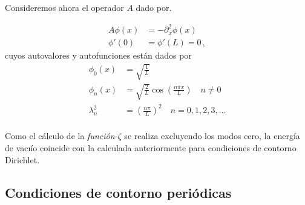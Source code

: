 Consideremos ahora el operador $A$ dado por.

\begin{equation}
\begin{aligned}
	A \phi (x) &= - \partial _x ^2 \phi (x) \\[10pt]
    \phi ' (0) &= \phi ' (L) = 0 \, ,
\end{aligned}
\end{equation}
cuyos autovalores y autofunciones están dados por
\begin{equation}
\begin{aligned}
	\phi _0 (x) &= \sqrt{ \frac{1}{L} } \\[5pt]
	\phi _n (x)  &= \sqrt{\frac{2}{L}} \cos \left( \frac{n \pi x}{L} \right) 
	\, \, \, \, \, \, n \neq 0\\[5pt]
	\lambda ^2 _n  &= \left( \frac{n \pi }{L} \right) ^2 
	\, \, \, \, \, \,
	n = 0,1,2,3, \dots
	\\[5pt]
\end{aligned}
\end{equation}


Como el cálculo de la {\it función-$\zeta$} se realiza excluyendo los modos cero, la
energía de vacıío coincide con la calculada anteriormente para condiciones
de contorno Dirichlet.\\


\subsection*{Condiciones de contorno periódicas}


